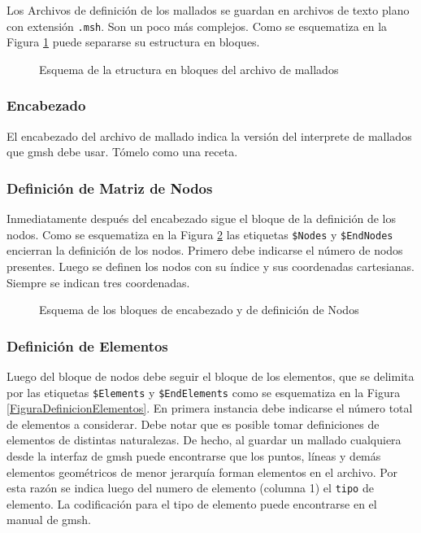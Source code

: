 Los Archivos de definición de los mallados se guardan en 
archivos de texto plano con extensión 
\texttt{.msh}. Son un poco más 
complejos. Como se esquematiza en la Figura 
\ref{FiguraEstructuraMallados} puede separarse su estructura
en bloques. 
\begin{figure}
  \caption{Esquema de la etructura en bloques del archivo
  de mallados\label{FiguraEstructuraMallados} }
\end{figure}

\subsubsection{Encabezado}

El encabezado del archivo de mallado indica la versión del 
interprete de mallados que gmsh debe usar. Tómelo como
una receta. 

\subsubsection{Definición de Matriz de Nodos}

Inmediatamente después del encabezado sigue el bloque de 
la definición de los nodos. Como se esquematiza en la 
Figura \ref{FiguraEncabezado} las etiquetas \texttt{\$Nodes} 
y \texttt{\$EndNodes} encierran la definición de los 
nodos. Primero debe indicarse el número de nodos 
presentes. Luego se definen los nodos con su índice y sus 
coordenadas cartesianas. Siempre se indican tres coordenadas. 

\begin{figure}
  \caption{ Esquema de los bloques de encabezado y de 
  definición de Nodos \label{FiguraEncabezado} }

\end{figure}

\subsubsection{Definición de Elementos}

Luego del bloque de nodos debe seguir el bloque de los 
elementos, que se delimita por las etiquetas 
\texttt{\$Elements} y \texttt{\$EndElements} como se 
esquematiza en la Figura \ref{FiguraDefinicionElementos}. En
primera instancia debe indicarse el número total de elementos 
a considerar. Debe notar que es posible tomar definiciones
de elementos de distintas naturalezas. De hecho, al guardar
un mallado cualquiera desde la interfaz de gmsh puede 
encontrarse que los puntos, líneas y demás elementos 
geométricos de menor jerarquía forman elementos en 
el archivo. Por esta razón se indica luego del numero de
elemento (columna 1) el \texttt{tipo} de elemento. La
codificación para el tipo de elemento puede encontrarse 
en el manual de gmsh. 

